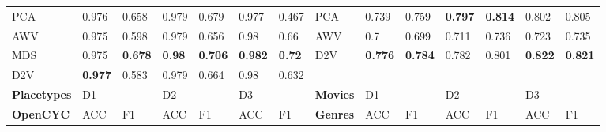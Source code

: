 {\begin{landscape}
\begin{table}[]
\begin{tabular}{llllllllllllll}
\toprule[\heavyrulewidth]
PCA        & 0.976                           & 0.658                           & 0.979                           & 0.679                           & 0.977                           & 0.467                           & PCA                             & 0.739                           & 0.759                           & \textbf{0.797} & \textbf{0.814} & 0.802                           & 0.805                           \\
AWV        & 0.975                           & 0.598                           & 0.979                           & 0.656                           & 0.98                            & 0.66                            & AWV                             & 0.7                             & 0.699                           & 0.711                           & 0.736                           & 0.723                           & 0.735                           \\
MDS        & 0.975                           & \textbf{0.678} & \textbf{0.98}  & \textbf{0.706} & \textbf{0.982} & \textbf{0.72}  & D2V                             & \textbf{0.776} & \textbf{0.784} & 0.782                           & 0.801                           & \textbf{0.822} & \textbf{0.821} \\
D2V        & \textbf{0.977} & 0.583                           & 0.979                           & 0.664                           & 0.98                            & 0.632                           &                                 &                                 &                                 &                                 &                                 &                                 &                                 \\
\textbf{Placetypes} & D1                              &                                 & D2                              &                                 & D3                              &                                 & \textbf{Movies}                          & D1                              &                                 & D2                              &                                 & D3                              &                                 \\
\textbf{OpenCYC}    & ACC                             & F1                              & ACC                             & F1                              & ACC                             & F1                              & \textbf{Genres}                         & ACC                             & F1                              & ACC                             & F1                              & ACC                             & F1                              \\

\end{tabular}
\end{table}
\end{landscape}}
